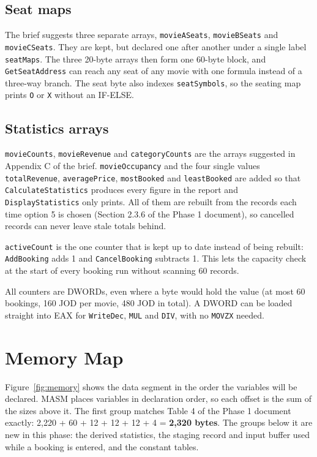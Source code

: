 \documentclass{thesis-library}
\begin{document}
\subsection*{Seat maps}

The brief suggests three separate arrays, \texttt{movieASeats}, \texttt{movieBSeats} and \texttt{movieCSeats}. They are kept, but declared one after another under a single label \texttt{seatMaps}. The three 20-byte arrays then form one 60-byte block, and \texttt{GetSeatAddress} can reach any seat of any movie with one formula instead of a three-way branch. The seat byte also indexes \texttt{seatSymbols}, so the seating map prints \texttt{O} or \texttt{X} without an IF-ELSE.

\subsection*{Statistics arrays}

\texttt{movieCounts}, \texttt{movieRevenue} and \texttt{categoryCounts} are the arrays suggested in Appendix C of the brief. \texttt{movieOccupancy} and the four single values \texttt{totalRevenue}, \texttt{averagePrice}, \texttt{mostBooked} and \texttt{leastBooked} are added so that \texttt{CalculateStatistics} produces every figure in the report and \texttt{DisplayStatistics} only prints. All of them are rebuilt from the records each time option 5 is chosen (Section 2.3.6 of the Phase 1 document), so cancelled records can never leave stale totals behind.

\texttt{activeCount} is the one counter that is kept up to date instead of being rebuilt: \texttt{AddBooking} adds 1 and \texttt{CancelBooking} subtracts 1. This lets the capacity check at the start of every booking run without scanning 60 records.

All counters are DWORDs, even where a byte would hold the value (at most 60 bookings, 160 JOD per movie, 480 JOD in total). A DWORD can be loaded straight into EAX for \texttt{WriteDec}, \texttt{MUL} and \texttt{DIV}, with no \texttt{MOVZX} needed.

\section{Memory Map}

Figure~\ref{fig:memory} shows the data segment in the order the variables will be declared. MASM places variables in declaration order, so each offset is the sum of the sizes above it. The first group matches Table 4 of the Phase 1 document exactly: 2,220 + 60 + 12 + 12 + 12 + 4 = \textbf{2,320 bytes}. The groups below it are new in this phase: the derived statistics, the staging record and input buffer used while a booking is entered, and the constant tables.
\end{document}
